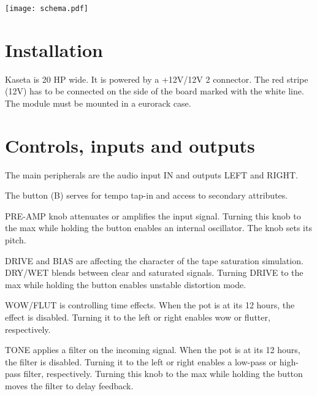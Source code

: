 \documentclass[11pt]{article}
\begin{document}
\begin{minipage}{0.6\textwidth}
\vspace{8mm}

\begin{center}
  \texttt{[image: schema.pdf]}
\end{center}

\end{minipage}

\newpage
\color{black}

\begin{minipage}[t]{0.55\textwidth}
\setlength{\parskip}{6pt}

\section{Installation}

Kaseta is 20 HP wide. It is powered by a +12V/{\textminus}12V 2
connector. The red stripe (\textminus12V) has to be connected on the side of the
board marked with the white line. The module must be mounted in a eurorack case.

\section{Controls, inputs and outputs}

The main peripherals are the audio input IN and outputs LEFT and RIGHT.

The button (B) serves for tempo tap-in and access to secondary attributes.

PRE-AMP knob attenuates or amplifies the input signal. Turning this knob to the max while holding the button enables an internal oscillator. The knob sets its pitch.

DRIVE and BIAS are affecting the character of the tape saturation simulation. DRY/WET blends between clear and saturated signals. Turning DRIVE to the max while holding the button enables unstable distortion mode.

WOW/FLUT is controlling time effects. When the pot is at its 12 hours, the effect is disabled. Turning it to the left or right enables wow or flutter, respectively.

TONE applies a filter on the incoming signal. When the pot is at its 12 hours, the filter is disabled. Turning it to the left or right enables a low-pass or high-pass filter, respectively. Turning this knob to the max while holding the button moves the filter to delay feedback.


\end{minipage}
\end{document}
